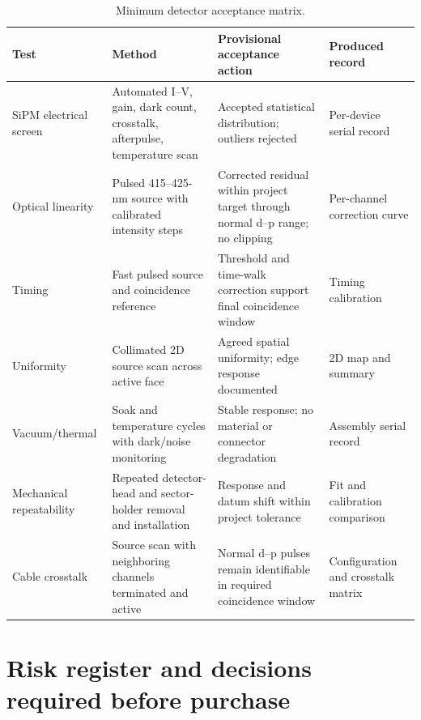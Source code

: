 \documentclass[10pt,letterpaper]{article}
\begin{document}
\begin{table}[htbp]
  \centering
  \scriptsize
  \caption{Minimum detector acceptance matrix.}
  \begin{tabularx}{\textwidth}{L{0.16\textwidth}L{0.27\textwidth}Y L{0.18\textwidth}}
    \toprule
    Test & Method & Provisional acceptance action & Produced record \\
    \midrule
    SiPM electrical screen & Automated I--V, gain, dark count, crosstalk, afterpulse,
      temperature scan & Accepted statistical distribution; outliers rejected &
      Per-device serial record \\
    Optical linearity & Pulsed 415--425-nm source with calibrated intensity steps &
      Corrected residual within project target through normal d--p range; no clipping &
      Per-channel correction curve \\
    Timing & Fast pulsed source and coincidence reference &
      Threshold and time-walk correction support final coincidence window &
      Timing calibration \\
    Uniformity & Collimated 2D source scan across active face &
      Agreed spatial uniformity; edge response documented &
      2D map and summary \\
    Vacuum/thermal & Soak and temperature cycles with dark/noise monitoring &
      Stable response; no material or connector degradation &
      Assembly serial record \\
    Mechanical repeatability & Repeated detector-head and sector-holder removal and installation &
      Response and datum shift within project tolerance &
      Fit and calibration comparison \\
    Cable crosstalk & Source scan with neighboring channels terminated and active &
      Normal d--p pulses remain identifiable in required coincidence window &
      Configuration and crosstalk matrix \\
    \bottomrule
  \end{tabularx}
\end{table}

\section{Risk register and decisions required before purchase}
\end{document}
